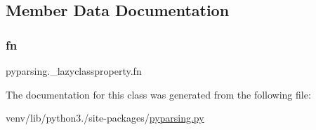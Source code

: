 \subsection{Member Data Documentation}
\mbox{\label{classpyparsing_1_1__lazyclassproperty_af8ec3b1a829489fad550c8b9ba066f90}} 
\subsubsection{\texorpdfstring{fn}{fn}}
{\footnotesize\ttfamily pyparsing.\+\_\+lazyclassproperty.\+fn}



The documentation for this class was generated from the following file\+:\begin{DoxyCompactItemize}
\item 
venv/lib/python3./site-\/packages/\hyperlink{pyparsing_8py}{pyparsing.\+py}\end{DoxyCompactItemize}
